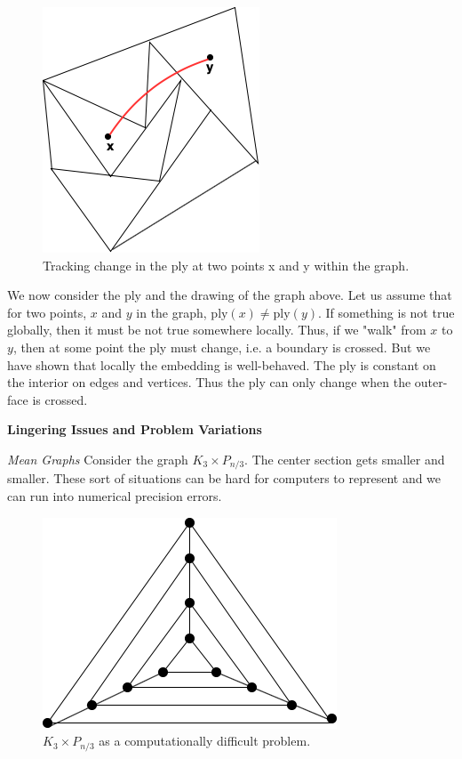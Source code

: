 \documentclass{article}
\begin{document}
    \begin{figure}[H]
    \centering
    \includegraphics[scale=0.5]{Images/change_of_ply_from_x_to_y.png}
    \caption{Tracking change in the ply at two points x and y within the graph.}
    \label{fig:my_label}
    \end{figure}
    \medskip \noindent We now consider the ply and the drawing of the graph above. Let us assume that for two points, $x$ and $y$ in the graph, $\text{ply}(x) \neq \text{ply}(y)$. If something is not true globally, then it must be not true somewhere locally. Thus, if we "walk" from $x$ to $y$, then at some point the ply must change, i.e. a boundary is crossed. But we have shown that locally the embedding is well-behaved. The ply is constant on the interior on edges and vertices. Thus the ply can only change when the outer-face is crossed. 
    
    \medskip \noindent \textbf{Lingering Issues and Problem Variations}
  
     \medskip \noindent \textit{Mean Graphs}
  \newline \noindent Consider the graph $K_3 \times P_{n/3}$. The center section gets smaller and smaller. These sort of situations can be hard for computers to represent and we can run into numerical precision errors. 
    \begin{figure}[H]
    \centering
    \includegraphics[scale=0.5]{Images/clique_cross_path.png}
    \caption{$K_3 \times P_{n/3}$ as a computationally difficult problem.}
    \label{fig:my_label}
    \end{figure}  
  
\end{document}
